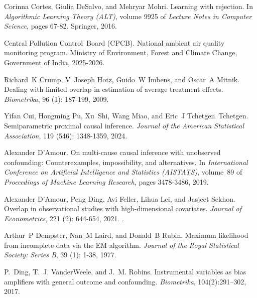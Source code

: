 Corinna Cortes, Giulia DeSalvo, and Mehryar Mohri.
\newblock Learning with rejection.
\newblock In \emph{Algorithmic Learning Theory (ALT)}, volume 9925 of \emph{Lecture Notes in Computer Science}, pages 67-82. Springer, 2016.

Central Pollution Control~Board (CPCB).
\newblock National ambient air quality monitoring program.
\newblock Ministry of Environment, Forest and Climate Change, Government of India, 2025-2026.

Richard~K Crump, V~Joseph Hotz, Guido~W Imbens, and Oscar~A Mitnik.
\newblock Dealing with limited overlap in estimation of average treatment effects.
\newblock \emph{Biometrika}, 96 (1): 187-199, 2009.

Yifan Cui, Hongming Pu, Xu~Shi, Wang Miao, and Eric~J Tchetgen~Tchetgen.
\newblock Semiparametric proximal causal inference.
\newblock \emph{Journal of the American Statistical Association}, 119 (546): 1348-1359, 2024.

Alexander D'Amour.
\newblock On multi-cause causal inference with unobserved confounding: Counterexamples, impossibility, and alternatives.
\newblock In \emph{International Conference on Artificial Intelligence and Statistics (AISTATS)}, volume~89 of \emph{Proceedings of Machine Learning Research}, pages 3478-3486, 2019.

Alexander D'Amour, Peng Ding, Avi Feller, Lihua Lei, and Jasjeet Sekhon.
\newblock Overlap in observational studies with high-dimensional covariates.
\newblock \emph{Journal of Econometrics}, 221 (2): 644-654, 2021.
\newblock {}.

Arthur~P Dempster, Nan~M Laird, and Donald~B Rubin.
\newblock Maximum likelihood from incomplete data via the {EM} algorithm.
\newblock \emph{Journal of the Royal Statistical Society: Series B}, 39 (1): 1-38, 1977.

P.~Ding, T.~J. VanderWeele, and J.~M. Robins.
\newblock Instrumental variables as bias amplifiers with general outcome and confounding.
\newblock \emph{Biometrika}, 104(2):291--302, 2017.

